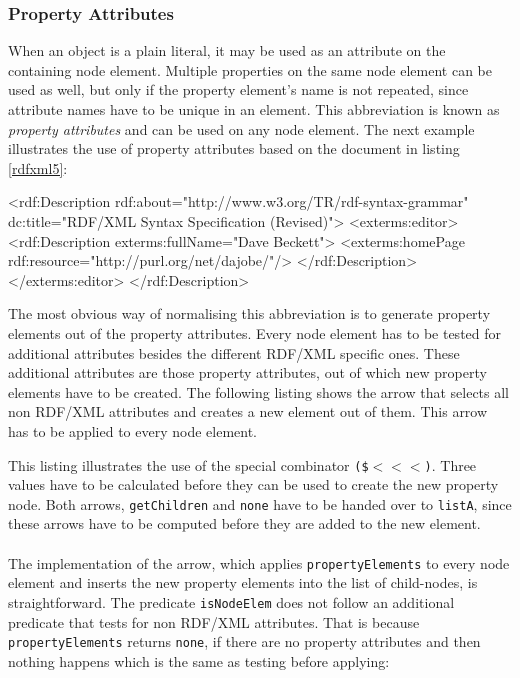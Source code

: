 \documentclass[11pt,a4paper,headsepline, bibtotoc]{scrreprt}
\begin{document}
\subsubsection{Property Attributes}
When an object is a plain literal, it may be used as an attribute on the containing node element. Multiple properties on the same node element can be used as well, but only if the property element's name is not repeated, since attribute names have to be unique in an element. This abbreviation is known as \textit{property attributes} and can be used on any node element. The next example illustrates the use of property attributes based on the document in listing \ref{rdfxml5}:
\clearpage
\begin{xmlnb}
<rdf:Description rdf:about="http://www.w3.org/TR/rdf-syntax-grammar"
                 dc:title="RDF/XML Syntax Specification (Revised)">
  <exterms:editor>
    <rdf:Description exterms:fullName="Dave Beckett">
      <exterms:homePage rdf:resource="http://purl.org/net/dajobe/"/>
    </rdf:Description>
  </exterms:editor>
</rdf:Description>
\end{xmlnb}
The most obvious way of normalising this abbreviation is to generate property elements out of the property attributes. Every node element has to be tested for additional attributes besides the different RDF/XML specific ones. These additional attributes are those property attributes, out of which new property elements have to be created. The following listing shows the arrow that selects all non RDF/XML attributes and creates a new element out of them. This arrow has to be applied to every node element.
This listing illustrates the use of the special combinator \texttt{(\$$<$$<$$<$)}. Three values have to be calculated before they can be used to create the new property node. Both arrows, \texttt{getChildren} and \texttt{none} have to be handed over to \texttt{listA}, since these arrows have to be computed before they are added to the new element.\\ 
\\
The implementation of the arrow, which applies \texttt{propertyElements} to every node element and inserts the new property elements into the list of child-nodes, is straightforward. The predicate \texttt{isNodeElem} does not follow an additional predicate that tests for non RDF/XML attributes. That is because \texttt{propertyElements} returns \texttt{none}, if there are no property attributes and then nothing happens which is the same as testing before applying:
\end{document}
